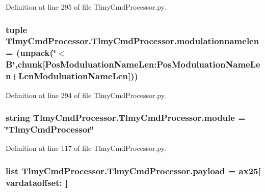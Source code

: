 Definition at line 295 of file Tlmy\+Cmd\+Processor.\+py.

\hypertarget{namespace_tlmy_cmd_processor_1_1_tlmy_cmd_processor_ab58241d3bba0b73ecff4c2d4dfa1263e}{}
\subsubsection[{modulationnamelen}]{\setlength{\rightskip}{0pt plus 5cm}tuple Tlmy\+Cmd\+Processor.\+Tlmy\+Cmd\+Processor.\+modulationnamelen = (unpack(\char`\"{}$<$B\char`\"{},chunk\mbox{[}Pos\+Moduluation\+Name\+Len\+:\+Pos\+Moduluation\+Name\+Len+{\bf Len\+Moduluation\+Name\+Len}\mbox{]}))}\label{namespace_tlmy_cmd_processor_1_1_tlmy_cmd_processor_ab58241d3bba0b73ecff4c2d4dfa1263e}


Definition at line 294 of file Tlmy\+Cmd\+Processor.\+py.

\hypertarget{namespace_tlmy_cmd_processor_1_1_tlmy_cmd_processor_a8f2365862c9bbb4fe399b2d3f801b4d5}{}
\subsubsection[{module}]{\setlength{\rightskip}{0pt plus 5cm}string Tlmy\+Cmd\+Processor.\+Tlmy\+Cmd\+Processor.\+module = \char`\"{}Tlmy\+Cmd\+Processor\char`\"{}}\label{namespace_tlmy_cmd_processor_1_1_tlmy_cmd_processor_a8f2365862c9bbb4fe399b2d3f801b4d5}


Definition at line 117 of file Tlmy\+Cmd\+Processor.\+py.

\hypertarget{namespace_tlmy_cmd_processor_1_1_tlmy_cmd_processor_afad1fe5f56562d9cdfea8af4d7377065}{}
\subsubsection[{payload}]{\setlength{\rightskip}{0pt plus 5cm}list Tlmy\+Cmd\+Processor.\+Tlmy\+Cmd\+Processor.\+payload = {\bf ax25}\mbox{[} vardataoffset\+: \mbox{]}}\label{namespace_tlmy_cmd_processor_1_1_tlmy_cmd_processor_afad1fe5f56562d9cdfea8af4d7377065}


